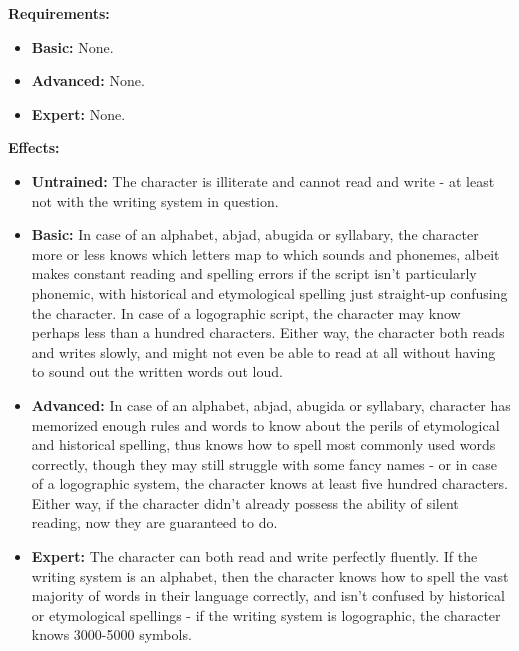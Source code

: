 \textbf{Requirements:}
\begin{itemize}
	\item \textbf{Basic:} None.
	\item \textbf{Advanced:} None.
	\item \textbf{Expert:} None.
\end{itemize}
\textbf{Effects:}
\begin{itemize}
	\item \textbf{Untrained:} The character is illiterate and cannot read and write - at least not with the writing system in question.
	\item \textbf{Basic:} In case of an alphabet, abjad, abugida or syllabary, the character more or less knows which letters map to which sounds and phonemes, albeit makes constant reading and spelling errors if the script isn't particularly phonemic, with historical and etymological spelling just straight-up confusing the character. In case of a logographic script, the character may know perhaps less than a hundred characters. Either way, the character both reads and writes slowly, and might not even be able to read at all without having to sound out the written words out loud.
	\item \textbf{Advanced:} In case of an alphabet, abjad, abugida or syllabary, character has memorized enough rules and words to know about the perils of etymological and historical spelling, thus knows how to spell most commonly used words correctly, though they may still struggle with some fancy names - or in case of a logographic system, the character knows at least five hundred characters. Either way, if the character didn't already possess the ability of silent reading, now they are guaranteed to do.
	\item \textbf{Expert:} The character can both read and write perfectly fluently. If the writing system is an alphabet, then the character knows how to spell the vast majority of words in their language correctly, and isn't confused by historical or etymological spellings - if the writing system is logographic, the character knows 3000-5000 symbols.
\end{itemize}\newpage
